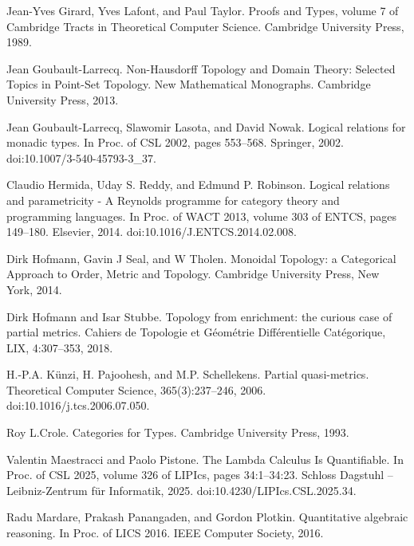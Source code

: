 \par\noindent  [18]  Jean-Yves Girard, Yves Lafont, and Paul Taylor.  Proofs and Types, volume 7 of Cambridge Tracts in Theoretical Computer Science.  Cambridge University Press, 1989.  
 
\par\noindent  [19]  Jean Goubault-Larrecq.  Non-Hausdorff Topology and Domain Theory: Selected Topics in Point-Set Topology.  New Mathematical Monographs. Cambridge University Press, 2013.  
 
\par\noindent  [20]  Jean Goubault-Larrecq, Slawomir Lasota, and David Nowak.  Logical relations for monadic types.  In Proc. of CSL 2002, pages 553–568. Springer, 2002.  doi:10.1007/3-540-45793-3\_37.  
 
\par\noindent  [21]  Claudio Hermida, Uday S. Reddy, and Edmund P. Robinson.  Logical relations and parametricity - A Reynolds programme for category theory and programming languages.  In Proc. of WACT 2013, volume 303 of ENTCS, pages 149–180. Elsevier, 2014.  doi:10.1016/J.ENTCS.2014.02.008.  
 
\par\noindent  [22]  Dirk Hofmann, Gavin J Seal, and W Tholen.  Monoidal Topology: a Categorical Approach to Order, Metric and Topology.  Cambridge University Press, New York, 2014.  
 
\par\noindent  [23]  Dirk Hofmann and Isar Stubbe.  Topology from enrichment: the curious case of partial metrics.  Cahiers de Topologie et Géométrie Différentielle Catégorique, LIX, 4:307–353, 2018.  
 
\par\noindent  [24]  H.-P.A. Künzi, H. Pajoohesh, and M.P. Schellekens.  Partial quasi-metrics.  Theoretical Computer Science, 365(3):237–246, 2006.  doi:10.1016/j.tcs.2006.07.050.  
 
\par\noindent  [25]  Roy L.Crole.  Categories for Types.  Cambridge University Press, 1993.  
 
\par\noindent  [26]  Valentin Maestracci and Paolo Pistone.  The Lambda Calculus Is Quantifiable.  In Proc. of CSL 2025, volume 326 of LIPIcs, pages 34:1–34:23. Schloss Dagstuhl – Leibniz-Zentrum für Informatik, 2025.  doi:10.4230/LIPIcs.CSL.2025.34.  
 
\par\noindent  [27]  Radu Mardare, Prakash Panangaden, and Gordon Plotkin.  Quantitative algebraic reasoning.  In Proc. of LICS 2016. IEEE Computer Society, 2016.  
 
